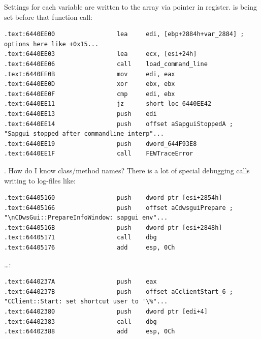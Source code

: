 {Settings for each variable are written to the array via pointer in \EDI register. \EDI is being set before that function call}:

\begin{lstlisting}
.text:6440EE00                 lea     edi, [ebp+2884h+var_2884] ; options here like +0x15...
.text:6440EE03                 lea     ecx, [esi+24h]
.text:6440EE06                 call    load_command_line
.text:6440EE0B                 mov     edi, eax
.text:6440EE0D                 xor     ebx, ebx
.text:6440EE0F                 cmp     edi, ebx
.text:6440EE11                 jz      short loc_6440EE42
.text:6440EE13                 push    edi
.text:6440EE14                 push    offset aSapguiStoppedA ; "Sapgui stopped after commandline interp"...
.text:6440EE19                 push    dword_644F93E8
.text:6440EE1F                 call    FEWTraceError
\end{lstlisting}

 .
{How do I know class/method names? There is a lot of special debugging calls writing to log-files like}:

\begin{lstlisting}
.text:64405160                 push    dword ptr [esi+2854h]
.text:64405166                 push    offset aCdwsguiPrepare ; "\nCDwsGui::PrepareInfoWindow: sapgui env"...
.text:6440516B                 push    dword ptr [esi+2848h]
.text:64405171                 call    dbg
.text:64405176                 add     esp, 0Ch
\end{lstlisting}

\dots {}:

\begin{lstlisting}
.text:6440237A                 push    eax
.text:6440237B                 push    offset aCclientStart_6 ; "CClient::Start: set shortcut user to '\%"...
.text:64402380                 push    dword ptr [edi+4]
.text:64402383                 call    dbg
.text:64402388                 add     esp, 0Ch
\end{lstlisting}

